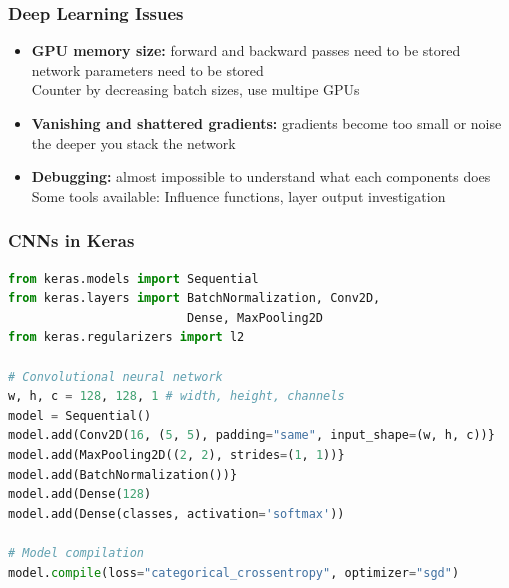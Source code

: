 \documentclass[aspectratio=1610]{beamer}
\begin{document}
\begin{frame}
\begin{columns}
\begin{column}{0.48\textwidth}
\begin{figure}
        \end{figure}
    \end{column}
\end{columns}
\end{frame}

\begin{frame}
\frametitle{Deep Learning Issues}

\begin{itemize}
    \item \textbf{GPU memory size:} forward and backward passes need to be stored\\
    network parameters need to be stored\\
    Counter by decreasing batch sizes, use multipe GPUs
    \item \textbf{Vanishing and shattered gradients:} gradients become too small or noise the deeper you stack the network\\
    \item \textbf{Debugging:} almost impossible to understand what each components does\\
    Some tools available: Influence functions, layer output investigation
\end{itemize}
\end{frame}

\begin{frame}[fragile]
\frametitle{CNNs in Keras}

\begin{lstlisting}[language=Python]
from keras.models import Sequential
from keras.layers import BatchNormalization, Conv2D,
                         Dense, MaxPooling2D
from keras.regularizers import l2

# Convolutional neural network
w, h, c = 128, 128, 1 # width, height, channels
model = Sequential()
model.add(Conv2D(16, (5, 5), padding="same", input_shape=(w, h, c))}
model.add(MaxPooling2D((2, 2), strides=(1, 1))}
model.add(BatchNormalization())}
model.add(Dense(128)
model.add(Dense(classes, activation='softmax'))

# Model compilation
model.compile(loss="categorical_crossentropy", optimizer="sgd")
\end{lstlisting}

\end{frame}
\end{document}
